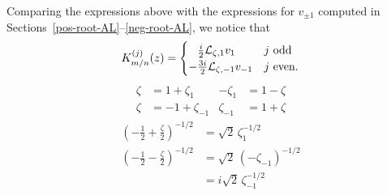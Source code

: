 \documentclass{article}
\newcommand{\laplace}{\mathcal{L}}
\theoremstyle{definition}
\theoremstyle{plain}
\newenvironment{verify}{\color{ForestGreen}}{\color{black}}
\newenvironment{old}{\color{RoyalBlue}}{\color{black}}
\begin{document}
\begin{old}
Comparing the expressions above with the expressions for $v_{\pm 1}$ computed in Sections~\ref{pos-root-AL}\;--\;\ref{neg-root-AL}, we notice that
\[ K^{(j)}_{m/n}(z) = \begin{cases}
\hphantom{-}\frac{i}{2}\laplace_{\zeta, 1} v_1 & j \text{ odd} \\
-\frac{3i}{2}\laplace_{\zeta, -1} v_{-1} & j \text{ even}.
\end{cases} \]
\begin{verify}
\begin{align*}
\zeta & = 1 + \zeta_1 & -\zeta_1 & = 1 - \zeta \\
\zeta & = -1 + \zeta_{-1} & \zeta_{-1} & = 1 + \zeta
\end{align*}
\begin{align*}
\left(-\frac{1}{2}+\frac{\zeta}{2}\right)^{-1/2} & = \sqrt{2}\,\zeta_1^{-1/2} \\
\left(-\frac{1}{2}-\frac{\zeta}{2}\right)^{-1/2} & = \sqrt{2}\,(-\zeta_{-1})^{-1/2} \\
& = i\sqrt{2}\,\zeta_{-1}^{-1/2}
\end{align*}
\end{verify}
\end{old}
%
\end{document}
